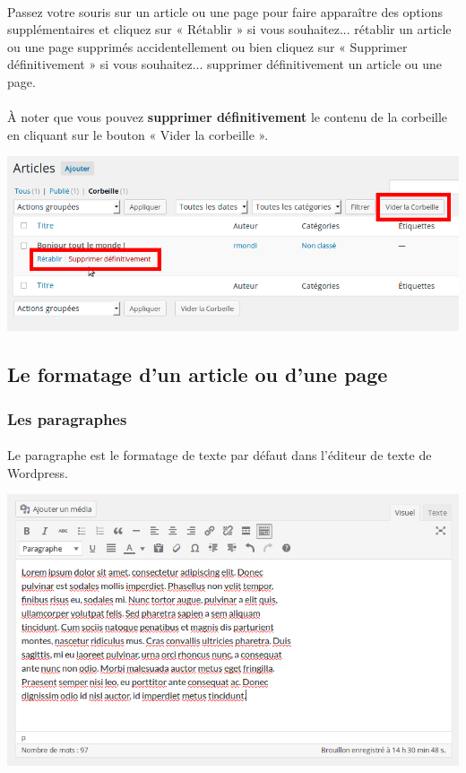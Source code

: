 \documentclass[10pt,a4paper]{article}
\begin{document}
\paragraph{}Passez votre souris sur un article ou une page pour faire apparaître des options supplémentaires et cliquez sur « Rétablir » si vous souhaitez... rétablir un article ou une page supprimés accidentellement ou bien cliquez sur « Supprimer définitivement » si vous souhaitez... supprimer définitivement un article ou une page.
\paragraph{}À noter que vous pouvez \textbf{supprimer définitivement} le contenu de la corbeille en cliquant sur le bouton « Vider la corbeille ».
\begin{center}
\includegraphics[scale=0.35]{img/0070.png}
\end{center}
\subsection{Le formatage d'un article ou d'une page}
\subsubsection{Les paragraphes}
\paragraph{} Le paragraphe est le formatage de texte par défaut dans l'éditeur de texte de Wordpress.
\begin{center}
\includegraphics[scale=0.35]{img/0071.png}
\end{center}
\end{document}
